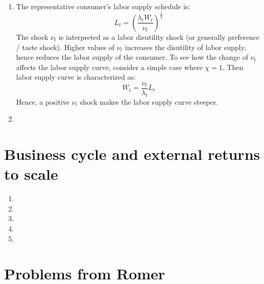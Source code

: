 \documentclass[11pt]{amsart}
\begin{document}
\begin{enumerate}[label=(\alph*)]
	\item The representative consumer's labor supply schedule is: 
	\begin{equation*}
	L_t = \left( \frac{\lambda_t W_t}{\nu_t} \right)^{\frac{1}{\chi}}
	\end{equation*}
	The shock $\nu_t$ is interpreted as a labor disutility shock (or generally preference / taste shock). Higher values of $\nu_t$ increases the disutility of labor supply, hence reduces the labor supply of the consumer. To see how the change of $\nu_t$ affects the labor supply curve, consider a simple case where $\chi = 1$. Then labor supply curve is characterized as: 
	\begin{equation*}
	W_t = \frac{\nu_t}{\lambda_t} L_t 
	\end{equation*}
	Hence, a positive $\nu_t$ shock makes the labor supply curve steeper. 
	\item
\end{enumerate}
\section{Business cycle and external returns to scale}
\begin{enumerate}[label=(\alph*)]
	\item 
	\item
	\item
	\item
	\item
\end{enumerate}
\section{Problems from Romer}
\end{document}
